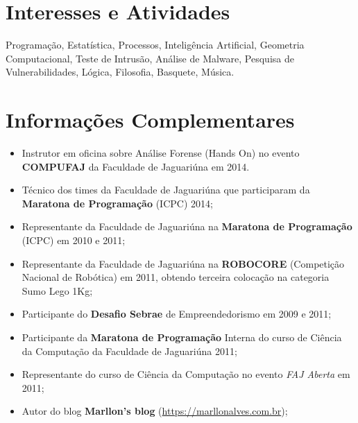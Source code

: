 \documentclass[a4paper,10pt]{article} %
\begin{document}

\section{Interesses e Atividades}

Programação, Estatística, Processos, Inteligência Artificial, Geometria Computacional, Teste de Intrusão, Análise de Malware, Pesquisa de Vulnerabilidades, Lógica,  Filosofia, Basquete, Música. %



\section{Informações Complementares}

\begin{itemize}
  \item Instrutor em oficina sobre Análise Forense (Hands On) no evento \textbf{COMPUFAJ} da Faculdade de Jaguariúna em 2014.
  \item Técnico dos times da Faculdade de Jaguariúna que participaram da \textbf{Maratona de Programação} (ICPC) 2014;  
  \item Representante da Faculdade de Jaguariúna na \textbf{Maratona de Programação} (ICPC) em 2010 e 2011;  
  \item Representante da Faculdade de Jaguariúna na \textbf{ROBOCORE} (Competição Nacional de Robótica) em 2011, obtendo terceira colocação na categoria Sumo Lego 1Kg;
  \item Participante do \textbf{Desafio Sebrae} de Empreendedorismo em 2009 e 2011;
  \item Participante da \textbf{Maratona de Programação} Interna do curso de Ciência da Computação da Faculdade de Jaguariúna 2011;
  \item Representante do curso de Ciência da Computação no evento \emph{FAJ Aberta} em 2011;
  \item Autor do blog \textbf{Marllon's blog} (\url{https://marllonalves.com.br});
  {\fb}\setmainfont[SmallCapsFont=Fontin SmallCaps]{Fontin-Regular}\\
\end{itemize}

\end{document}
